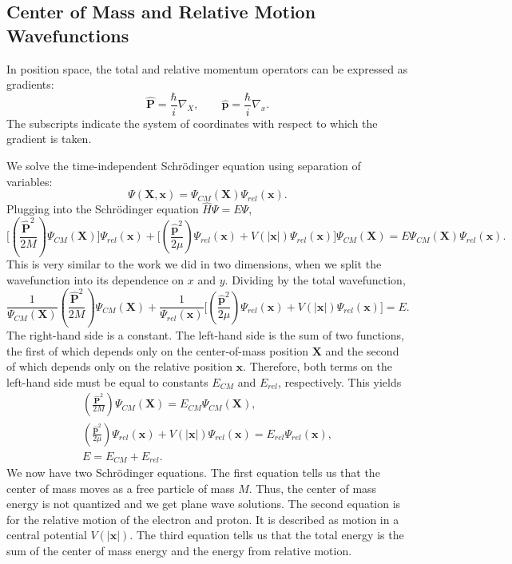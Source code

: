 \subsection{Center of Mass and Relative Motion Wavefunctions}\label{com_relative_wavefunctions}

In position space, the total and relative momentum operators can be expressed as gradients: $$\hat{\mathbf{P}}=\frac{\hbar}{i}\nabla_X, \qquad\hat{\mathbf{p}}=\frac{\hbar}{i}\nabla_x.$$The subscripts indicate the system of coordinates with respect to which the gradient is taken. 

We solve the time-independent Schrödinger equation using separation of variables: $$\Psi(\mathbf{X},\mathbf{x})=\Psi_{CM}(\mathbf{X})\Psi_{rel}(\mathbf{x}).$$Plugging into the Schrödinger equation $\hat{H}\Psi=E\Psi$, $$\bigg[(\frac{\hat{\mathbf{P}}^2}{2M})\Psi_{CM}(\mathbf{X})\bigg]\Psi_{rel}(\mathbf{x})+\bigg[(\frac{\hat{\mathbf{p}}^2}{2\mu})\Psi_{rel}(\mathbf{x})+V(|\mathbf{x}|)\Psi_{rel}(\mathbf{x})\bigg]\Psi_{CM}(\mathbf{X})=E\Psi_{CM}(\mathbf{X})\Psi_{rel}(\mathbf{x}).$$This is very similar to the work we did in two dimensions, when we split the wavefunction into its dependence on $x$ and $y$. Dividing by the total wavefunction, $$\frac{1}{\Psi_{CM}(\mathbf{X})}(\frac{\hat{\mathbf{P}}^2}{2M})\Psi_{CM}(\mathbf{X})+\frac{1}{\Psi_{rel}(\mathbf{x})}\bigg[(\frac{\hat{\mathbf{p}}^2}{2\mu})\Psi_{rel}(\mathbf{x})+V(|\mathbf{x}|)\Psi_{rel}(\mathbf{x})\bigg]=E.$$The right-hand side is a constant. The left-hand side is the sum of two functions, the first of which depends only on the center-of-mass position $\mathbf{X}$ and the second of which depends only on the relative position $\mathbf{x}$. Therefore, both terms on the left-hand side must be equal to constants $E_{CM}$ and $E_{rel}$, respectively. This yields \begin{align*}(\frac{\hat{\mathbf{P}}^2}{2M})\Psi_{CM}(\mathbf{X}) =E_{CM}\Psi_{CM}(\mathbf{X}), \\  (\frac{\hat{\mathbf{p}}^2}{2\mu})\Psi_{rel}(\mathbf{x})+V(|\mathbf{x}|)\Psi_{rel}(\mathbf{x}) = E_{rel}\Psi_{rel}(\mathbf{x}), \\ E = E_{CM}+E_{rel}.\end{align*}We now have two Schrödinger equations. The first equation tells us that the center of mass moves as a free particle of mass $M$. Thus, the center of mass energy is not quantized and we get plane wave solutions. The second equation is for the relative motion of the electron and proton. It is described as motion in a central potential $V(|\mathbf{x}|)$. The third equation tells us that the total energy is the sum of the center of mass energy and the energy from relative motion. 

